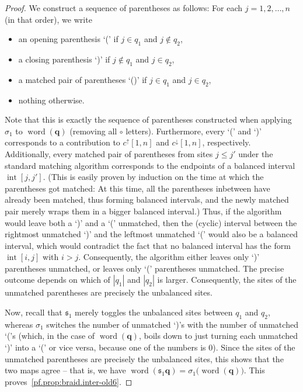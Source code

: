 \documentclass[reqno]{amsart}
\newcommand{\0}{\phantom{c}}
\DeclareMathOperator{\inter}{int} %
\newcommand{\qq}{\mathbf{q}}
\newcommand{\fraks}{\mathfrak{s}}
\newenvironment{verlong}{}{}
\newcommand{\word}{\operatorname{word}}
\newcommand{\abs}[1]{\left| #1 \right|}
\theoremstyle{plain}
\theoremstyle{definition}
\numberwithin{equation}{section}
\begin{document}
\begin{verlong}
\begin{proof}
We construct a sequence of parentheses as follows: For each $j = 1, 2, \dotsc, n$ (in that order), we write
\begin{itemize}
\item an opening parenthesis `(' if $j \in q_1$ and $j \notin q_2$,
\item a closing parenthesis `)' if $j \notin q_1$ and $j \in q_2$,
\item a matched pair of parentheses `()' if $j \in q_1$ and $j \in q_2$,
\item nothing otherwise.
\end{itemize}
Note that this is exactly the sequence of parentheses constructed when applying $\sigma_1$ to $\word(\qq)$ (removing all $\circ$ letters).
Furthermore, every `(' and `)' corresponds to a contribution to $c^{\uparrow}[1,n]$ and $c^{\downarrow}[1,n]$, respectively.
Additionally, every matched pair of parentheses from sites $j \leq j'$ under the standard matching algorithm corresponds to the endpoints of a balanced interval $\inter[j,j']$. (This is easily proven by induction on the time at which the parentheses got matched: At this time, all the parentheses inbetween have already been matched, thus forming balanced intervals, and the newly matched pair merely wraps them in a bigger balanced interval.)
Thus, if the algorithm would leave both a `)' and a `(' unmatched, then the (cyclic) interval between the rightmost unmatched `)' and the leftmost unmatched `(' would also be a balanced interval, which would contradict the fact that no balanced interval has the form $\inter[i,j]$ with $i > j$.
Consequently, the algorithm either leaves only `)' parentheses unmatched, or leaves only `(' parentheses unmatched.
The precise outcome depends on which of $\abs{q_1}$ and $\abs{q_2}$ is larger.
Consequently, the sites of the unmatched parentheses are precisely the unbalanced sites.

Now, recall that $\fraks_1$ merely toggles the unbalanced sites between $q_1$ and $q_2$, whereas $\sigma_1$ switches the number of unmatched `)'s with the number of unmatched `('s (which, in the case of $\word(\qq)$, boils down to just turning each unmatched `)' into a `(' or vice versa, because one of the numbers is $0$). Since the sites of the unmatched parentheses are precisely the unbalanced sites, this shows that the two maps agree -- that is, we have $\word(\fraks_1 \qq) = \sigma_1\bigl( \word(\qq) \bigr)$. This proves~\eqref{pf.prop:braid.inter-old6}.


\end{proof}
\end{verlong}
\end{document}

